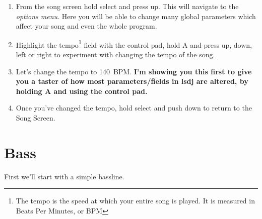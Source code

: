 \documentclass[]{article}
\newcommand{\buttonStyle}[1]{\textsf{#1}\xspace}
\newcommand{\bA}{\buttonStyle{A}}
\newcommand{\bRight}{\buttonStyle{right}}
\newcommand{\bLeft}{\buttonStyle{left}}
\newcommand{\bUp}{\buttonStyle{up}}
\newcommand{\bDown}{\buttonStyle{down}}
\newcommand{\bSelect}{\buttonStyle{select}}
\begin{document}

\begin{enumerate}



\item From the song screen hold select and press up. This will navigate to the \textit{options menu}. Here you will be able to change many global parameters which affect your song and even the whole program.

\item Highlight the tempo\footnote{The tempo is the speed at which your entire song is played. It is measured in Beats Per Minutes, or BPM} field with the control pad, hold \bA and press \bUp, \bDown, \bLeft or \bRight to experiment with changing the tempo of the song.

\item Let's change the tempo to 140~BPM. \textbf{I'm showing you this first to give you a taster of how most parameters/fields in lsdj are altered, by holding \bA and using the control pad.}

\item Once you've changed the tempo, hold \bSelect and push \bDown to return to the Song Screen.
\end{enumerate}

\section{Bass}

First we’ll start with a simple bassline.
\end{document}
